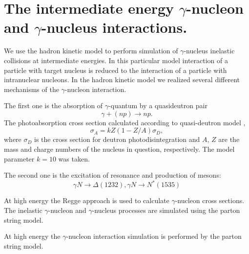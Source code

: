 \section{The intermediate energy $\gamma$-nucleon and $\gamma$-nucleus interactions.}

\hspace{1.0em}
We use the hadron kinetic model to perform simulation of $\gamma$-nucleus
inelastic collisions at intermediate energies. In this particular model
interaction of a particle with target nucleus is reduced to the interaction of 
a particle with intranuclear nucleons.
In the hadron kinetic model we realized several different mechanisms of the
$\gamma$-nucleon interaction.
 
The first one is the absorption of $\gamma$-quantum by a quasideutron pair
\begin{equation}
\label{IEGI1} \gamma + (np)\rightarrow np.
\end{equation}
The photoabsorption cross section calculated according to quasi-deutron model 
\cite{CS66}, \cite{BGIJT74} 
\begin{equation}
\label{IEGI2}\sigma_{A}=kZ(1-Z/A)\sigma_{D},
\end{equation}
where $\sigma_{D}$ is the cross section for deutron photodisintegration and
$A$, $Z$ are the mass and charge numbers of the nucleus in question,
respectively. The model parameter $k=10$ was taken.

The second one is the excitation of resonance and production of mesons:
\begin{equation}
\label{IEGI3} \gamma  N\rightarrow \Delta(1232),
 \gamma N \rightarrow N^{*}(1535) 
\end{equation}

At high energy the Regge approach is used to calculate $\gamma$-nucleon 
cross sections. The inelastic $\gamma$-nucleon and $\gamma$-nucleus
processes are simulated using the parton string
model.

At high energy the $\gamma$-nucleon interaction simulation is performed by the 
parton string model.
